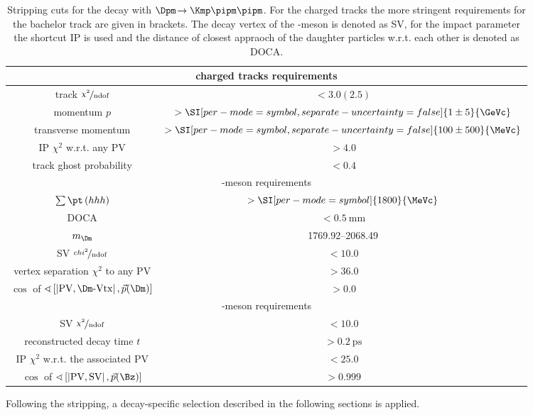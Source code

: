 \begin{table}[tbp]
	\centering
	\caption{Stripping cuts for the decay \BdToDpi with $\Dpm\!\to\Kmp\pipm\pipm$.
	For the charged tracks the more stringent requirements for the bachelor track are given in brackets.
	The decay vertex of the \Bz-meson is denoted as \ac{SV}, for the impact parameter the shortcut IP is used and the distance of closest appraoch of the \Dm daughter particles w.r.t. each other is denoted as DOCA.}
	\begin{tabular}{cc}
		\toprule
		\multicolumn{2}{c}{charged tracks requirements}\\
		\midrule
		track $\nicefrac{\chi^2}{\text{ndof}}$		& $<3.0 (2.5)$ \\
		momentum $p$ 								& $>\SI[per-mode=symbol, separate-uncertainty=false]{1\pm5}{\GeVc}$ \\
		transverse momentum \pt 					& $>\SI[per-mode=symbol, separate-uncertainty=false]{100\pm500}{\MeVc}$ \\
		IP $\chi^2$ w.r.t. any \ac{PV}				& $>4.0$ \\
		track ghost probability 					& $<0.4$ \\
		\midrule
		\multicolumn{2}{c}{\Dm-meson requirements}\\
		\midrule
		$\sum \pt\left(hhh\right)$ 																				& $>\SI[per-mode=symbol]{1800}{\MeVc}$ \\
		DOCA 																									& $<\SI{0.5}{\milli\metre}$ \\
		$m_\Dm$ 																								& \SIrange[per-mode=symbol,range-units=single]{1769.92}{2068.49}{\MeVcc} \\
		\ac{SV} $\nicefrac{chi^2}{\text{ndof}}$ 																	& $<10.0$ \\
		vertex separation $\chi^2$ to any \ac{PV} 																	& $>36.0$ \\
		$\cos$ of $\sphericalangle\left[\left|\text{PV},\Dm\text{-Vtx}\right|, \vec{p}\!\left(\Dm\right)\right]$	& $>0.0$ \\
		\midrule
		\multicolumn{2}{c}{\Bz-meson requirements}\\
		\midrule
		\ac{SV} $\nicefrac{\chi^2}{\text{ndof}}$ 																& $<10.0$ \\
		reconstructed decay time $t$ 																			& $>\SI{0.2}{\pico\second}$ \\
		IP $\chi^2$ w.r.t. the associated \ac{PV} 																& $<25.0$ \\
		$\cos$ of $\sphericalangle\left[\left|\text{PV},\text{SV}\right|, \vec{p}\!\left(\Bz\right)\right]$		& $>0.999$ \\
		\bottomrule
	\end{tabular}
	\label{tab:stripping}
\end{table}
Following the stripping, a decay-specific selection described in the following sections is applied.

